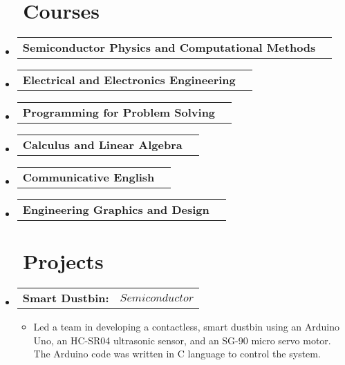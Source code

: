 \documentclass[a4paper,20pt]{article}
\makeatletter
\newcommand{\resumeItem}[2]{
    \item\small{
        \textbf{#1}{: #2 \vspace{-2pt}}
    }
}
\newcommand{\resumeItemWithoutTitle}[1]{
    \item\small{
            {\vspace{-2pt}}
    }
}
\newcommand{\resumeSubheadingSingleRow}[2]{
    \vspace{-1pt}\item
    \begin{tabular*}{0.97\textwidth}{l@{\extracolsep{\fill}}r}
        \textbf{#1} & \textit{#2}          \\
    \end{tabular*}\vspace{-5pt}
}
\newcommand{\resumeSubHeadingListStart}{\begin{itemize}[leftmargin=*]}
\newcommand{\resumeSubHeadingListEnd}{\end{itemize}}
\newcommand{\resumeItemListStart}{\begin{itemize}}
\newcommand{\resumeItemListEnd}{\end{itemize}\vspace{-5pt}}
\makeatother
\begin{document}
\section{~~Courses}
\vspace{5pt}
\resumeSubHeadingListStart
\resumeSubheadingSingleRow{Semiconductor Physics and Computational Methods}{}
\resumeSubHeadingListEnd
\resumeSubHeadingListStart
\vspace{-5pt}
\resumeSubheadingSingleRow{Electrical and Electronics Engineering}{}
\resumeSubHeadingListEnd
\vspace{-5pt}
\resumeSubHeadingListStart
\resumeSubheadingSingleRow{Programming for Problem Solving}{}
\resumeSubHeadingListEnd
\vspace{-5pt}
\resumeSubHeadingListStart
\resumeSubheadingSingleRow{Calculus and Linear Algebra}{}
\resumeSubHeadingListEnd
\vspace{-5pt}
\resumeSubHeadingListStart
\resumeSubheadingSingleRow{Communicative English}{}
\resumeSubHeadingListEnd
\vspace{-5pt}
\resumeSubHeadingListStart
\resumeSubheadingSingleRow{Engineering Graphics and Design}{}
\resumeSubHeadingListEnd
\vspace{-5pt}

\section{~~Projects}
\vspace{5pt}
\resumeSubHeadingListStart
\resumeSubheadingSingleRow{Smart Dustbin:}{\(Semiconductor\)}
\resumeItemListStart
\resumeItemWithoutTitle{}{Led a team in developing a contactless, smart dustbin using an Arduino Uno, an HC-SR04 ultrasonic sensor, and an SG-90 micro servo motor. The Arduino code was written in C language to control the system.}
\resumeItemListEnd
\resumeSubHeadingListEnd
\vspace{-5pt}
\end{document}
